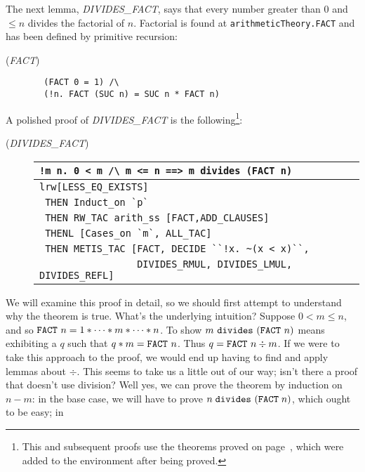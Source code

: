 The next lemma, {\small{\it DIVIDES\_FACT\/}}, says that every number
greater than $0$ and $\leq n$ divides the factorial of
$n$. Factorial is found at \verb+arithmeticTheory.FACT+ and has been
defined by primitive recursion:
\begin{description}
\item [\small{({\it FACT\/})}]
\begin{minipage}[t]{0.5\textwidth}
\begin{verbatim}
  (FACT 0 = 1) /\
  (!n. FACT (SUC n) = SUC n * FACT n)
\end{verbatim}
\end{minipage}
\end{description}
A polished proof of {\small{\it DIVIDES\_FACT\/}} is the
following\footnote{This and subsequent proofs use the theorems proved
  on page~\pageref{euclid:extra-proofs}, which were added to the \ML{} environment
  after being proved.}:
\begin{description}
\item [\small{({\it DIVIDES\_FACT\/})}]
\begin{tabular}[t]{l}
\verb+!m n. 0 < m /\ m <= n ==> m divides (FACT n)+ \\ \hline
\verb+lrw[LESS_EQ_EXISTS]+ \\
\verb+ THEN Induct_on `p`+ \\
\verb+ THEN RW_TAC arith_ss [FACT,ADD_CLAUSES]+ \\
\verb+ THENL [Cases_on `m`, ALL_TAC]+ \\
\verb+ THEN METIS_TAC [FACT, DECIDE ``!x. ~(x < x)``,+ \\
\verb+                 DIVIDES_RMUL, DIVIDES_LMUL, DIVIDES_REFL]+ \\
\end{tabular}
\end{description}
We will examine this proof in detail, so we should first attempt to
understand why the theorem is true. What's the underlying intuition?
Suppose $0 < m \leq n$, and so $\mbox{\tt FACT}\ n = 1 * \cdots * m *
\cdots * n$. To show $m\ \mbox{\tt divides}\ (\mbox{\tt FACT}\ n)$
means exhibiting a $q$ such that $q * m = \mbox{\tt FACT}\ n$. Thus $q
= \mbox{\tt FACT}\ n \div m$. If we were to take this approach to the
proof, we would end up having to find and apply lemmas about $\div$.
This seems to take us a little out of our way; isn't there a proof
that doesn't use division? Well yes, we can prove the theorem by
induction on $n - m$: in the base case, we will have to prove $n\;
\mbox{\tt divides}\ (\mbox{\tt FACT}\; n)$, which ought to be easy; in
